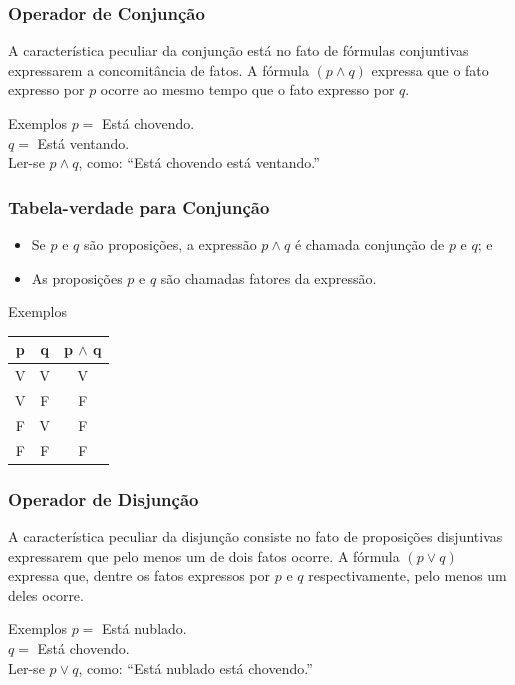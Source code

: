 \documentclass{beamer}
\begin{document}
\begin{frame}
\frametitle{Operador de Conjunção}

A característica peculiar da conjunção está no fato de fórmulas conjuntivas expressarem a concomitância de fatos. A fórmula $(p \wedge q)$ expressa que o
fato expresso por $p$ ocorre ao mesmo tempo que o fato expresso por $q$. \vfill

\begin{exampleblock}{Exemplos}
$p =$ Está chovendo.\\
$q =$ Está ventando.\\
Ler-se $p \wedge q$, como: ``Está chovendo  está ventando.''
\end{exampleblock}
\end{frame}

\begin{frame}
\frametitle{Tabela-verdade para Conjunção}

\begin{itemize}
\item Se $p$ e $q$ são proposições, a expressão $p \wedge q$ é chamada conjunção de $p$ e $q$; e
\item As proposições $p$ e $q$ são chamadas fatores da expressão.
\end{itemize} \vfill

\begin{exampleblock}{Exemplos}
\center
\begin{tabular}{|c|c|c|}
	\hline
	\textbf{p} & \textbf{q} & \textbf{p $\wedge$ q}\\ \hline
	V & V & V \\ \hline
	V & F & F \\ \hline
	F & V & F \\ \hline
	F & F & F \\ \hline
\end{tabular}
\end{exampleblock}
\end{frame}

\begin{frame}
\frametitle{Operador de Disjunção}

A característica peculiar da disjunção consiste no fato de proposições disjuntivas expressarem que pelo menos um de dois fatos ocorre. A fórmula $(p \vee q)$ expressa que, dentre os fatos expressos por $p$ e $q$ respectivamente,
pelo menos um deles ocorre. \vfill

\begin{exampleblock}{Exemplos}
$p =$ Está nublado.\\
$q =$ Está chovendo.\\
Ler-se $p \vee q$, como: ``Está nublado  está chovendo.''
\end{exampleblock}
\end{frame}
\end{document}
